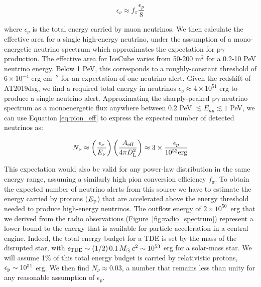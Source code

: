 \begin{equation}
\epsilon_{\nu} \approx f_{\pi} \frac{\epsilon_{p}}{8}
\label{eq:pion_eff}
\end{equation} 

where $\epsilon_{\nu}$ is the total energy carried by muon neutrinos. We then calculate the effective area for a single high-energy neutrino, under the assumption of a mono-energetic neutrino spectrum which approximates the expectation for p$\gamma$ production. The effective area for IceCube varies from 50-200 m$^{2}$ for a 0.2-10 PeV neutrino energy. Below 1 PeV, this corresponds to a roughly-constant threshold of $6 \times 10^{-4}$ erg cm$^{-2}$ for an expectation of one neutrino alert. Given the redshift of AT2019dsg, we find a required total energy in neutrinos $\epsilon_{\nu} \approx 4 \times 10^{51}$ erg to produce a single neutrino alert. 
Approximating the sharply-peaked p$\gamma$ neutrino spectrum as a monoenergetic flux anywhere between  0.2 PeV $\lesssim E_{nu} \lesssim 1$ PeV, we can use Equation \ref{eq:pion_eff} to express the expected number of detected neutrinos as:

\begin{equation}
N_\nu \approx  \left(\frac{\epsilon_{\nu} }{E_\nu}\right)\left(\frac{A_{  \textup{eff}}} {4\pi D_{  \textup{L}}^{2}}\right) \approx 3 \times \frac{\epsilon_{p}}{10^{53}  \textup{erg}} 
\end{equation} 

This expectation would also be valid for any power-law distribution in the same energy range, assuming a similarly high pion conversion efficiency $f_{\pi}$. To obtain the expected number of neutrino alerts from this source we have to estimate the energy carried by protons ($E_{\textup{p}}$) that are accelerated above the energy threshold needed to produce high-energy neutrinos. The outflow energy of $2 \times 10^{50}$~erg that we derived from the radio observations (Figure~\ref{fig:radio_spectrum}) represent a lower bound to the energy that is available for particle acceleration in a central engine.  Indeed, the total energy budget for a TDE is set by the mass of the disrupted star, with $\epsilon_{\textup{TDE}} \sim (1/2)\, 0.1 \, \mbox{$M_{\odot}$} \, c^{2} \sim 10^{53}$ erg for a solar-mass star. We will assume 1\% of this total energy budget is carried by relativistic protons, $\epsilon_{\textup{p}} \sim 10^{51}$ erg. We then find $N_\nu \approx 0.03$, a number that remains less than unity for any reasonable assumption of $\epsilon_{p}$. 

